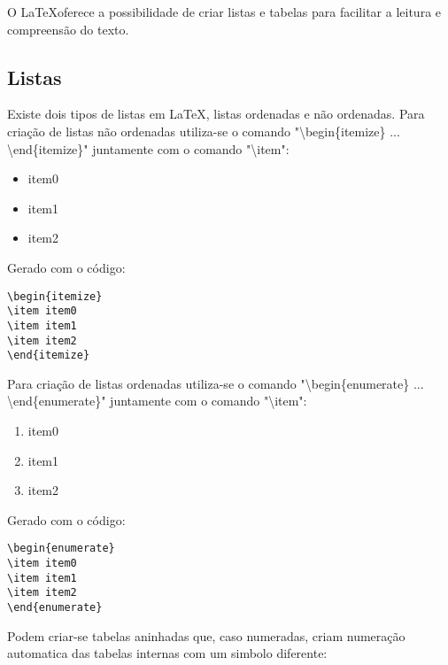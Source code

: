 O \LaTeX oferece a possibilidade de criar listas e tabelas para facilitar a leitura e compreensão do texto.

\subsection{Listas}
Existe dois tipos de listas em \LaTeX, listas ordenadas e não ordenadas. Para criação de listas não ordenadas utiliza-se o comando "\textbackslash begin\{itemize\} ... \textbackslash end\{itemize\}" juntamente com o comando "\textbackslash item":

\begin{itemize}
\item item0
\item item1
\item item2
\end{itemize}

Gerado com o código:
\begin{verbatim}
\begin{itemize}
\item item0
\item item1
\item item2
\end{itemize}
\end{verbatim}

Para criação de listas ordenadas utiliza-se o comando "\textbackslash begin\{enumerate\} ... \textbackslash end\{enumerate\}" juntamente com o comando "\textbackslash item":

\begin{enumerate}
\item item0
\item item1
\item item2
\end{enumerate}

Gerado com o código:
\begin{verbatim}
\begin{enumerate}
\item item0
\item item1
\item item2
\end{enumerate}
\end{verbatim}

Podem criar-se tabelas aninhadas que, caso numeradas, criam numeração automatica das tabelas internas com um simbolo diferente:

